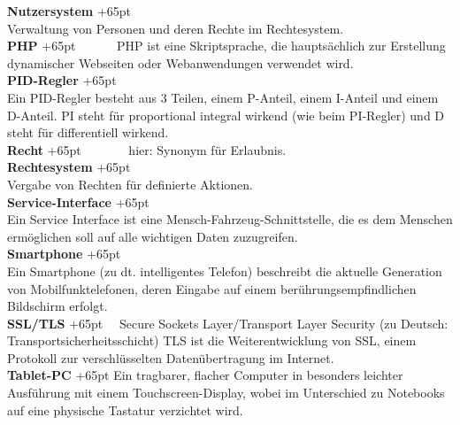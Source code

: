 \documentclass[fontsize = 12pt, paper = a4]{scrreprt}
\begin{document}
\textbf{Nutzersystem}
\hangindent+65pt  \\
Verwaltung von Personen und deren Rechte im Rechtesystem.\\



\textbf{PHP}
\hangindent+65pt 
\ \ \ \ \ \ PHP ist eine Skriptsprache, die hauptsächlich zur Erstellung dynamischer Webseiten oder Webanwendungen verwendet wird.\\

\textbf{PID-Regler}
\hangindent+65pt  \\
Ein PID-Regler besteht aus 3 Teilen, einem P-Anteil, einem I-Anteil und einem D-Anteil. PI steht für proportional integral wirkend (wie beim PI-Regler) und D steht für differentiell wirkend.\\

\textbf{Recht}
\hangindent+65pt  
\ \ \ \ \ \ \ hier: Synonym für Erlaubnis.\\

\textbf{Rechtesystem}
\hangindent+65pt  \\
Vergabe von Rechten für definierte Aktionen.\\

\textbf{Service-Interface}
\hangindent+65pt  \\
Ein Service Interface ist eine Mensch-Fahrzeug-Schnittstelle, die es dem Menschen ermöglichen soll auf alle wichtigen Daten zuzugreifen.\\

\textbf{Smartphone}
\hangindent+65pt  \\
Ein Smartphone (zu dt. intelligentes Telefon) beschreibt die aktuelle Gene\-ration von Mobilfunktelefonen, deren Eingabe auf einem berührungsempfindlichen Bildschirm erfolgt.\\

\textbf{SSL/TLS}
\hangindent+65pt  
\ \ Secure Sockets Layer/Transport Layer Security (zu Deutsch: Transportsicherheitsschicht) TLS ist die Weiterentwicklung von SSL, einem Protokoll zur verschlüsselten Datenübertragung im Internet.\\

\textbf{Tablet-PC}
\hangindent+65pt  
Ein tragbarer, flacher Computer in besonders leichter Ausführung mit einem Touchscreen-Display, wobei im Unterschied zu Notebooks auf eine physische Tastatur verzichtet wird.\\
\end{document}
